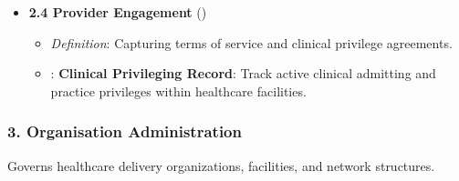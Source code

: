 \begin{itemize}
\begin{itemize}

\item 
\emph{Definition}: Managing organizational affiliations and multidisciplinary team relationships.



\item 
\texttt{}: \textbf{Practitioner-Organisation Affiliation}: Maintain temporal affiliations between practitioners and healthcare organizations.



\end{itemize}


\item 
\textbf{2.4 Provider Engagement} (\texttt{})


\begin{itemize}

\item 
\emph{Definition}: Capturing terms of service and clinical privilege agreements.



\item 
\texttt{}: \textbf{Clinical Privileging Record}: Track active clinical admitting and practice privileges within healthcare facilities.



\end{itemize}


\end{itemize}
\label{rad:enabling:158}
\subsubsection*{3. Organisation Administration}
\label{rad:enabling:159}

Governs healthcare delivery organizations, facilities, and network structures.

\label{rad:enabling:161}

